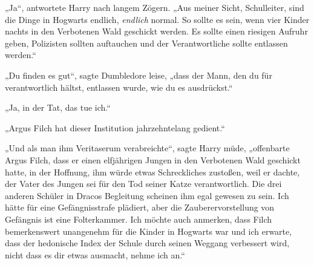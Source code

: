 „Ja“, antwortete Harry nach langem Zögern.
„Aus meiner Sicht, Schulleiter, sind die Dinge in Hogwarts endlich, \emph{endlich} normal. So sollte es sein, wenn vier Kinder nachts in den Verbotenen Wald geschickt werden. Es sollte einen riesigen Aufruhr geben, Polizisten sollten auftauchen und der Verantwortliche sollte entlassen werden.“

„Du finden es gut“, sagte Dumbledore leise, „dass der Mann, den du für verantwortlich hältst, entlassen wurde, wie du es ausdrückst.“

„Ja, in der Tat, das tue ich.“

„Argus Filch hat dieser Institution jahrzehntelang gedient.“

„Und als man ihm Veritaserum verabreichte“, sagte Harry müde, „offenbarte Argus Filch, dass er einen elfjährigen Jungen in den Verbotenen Wald geschickt hatte, in der Hoffnung, ihm würde etwas Schreckliches zustoßen, weil er dachte, der Vater des Jungen sei für den Tod seiner Katze verantwortlich. Die drei anderen Schüler in Dracos Begleitung scheinen ihm egal gewesen zu sein. Ich hätte für eine Gefängnisstrafe plädiert, aber die Zauberervorstellung von Gefängnis ist eine Folterkammer. Ich möchte auch anmerken, dass Filch bemerkenswert unangenehm für die Kinder in Hogwarts war und ich erwarte, dass der hedonische Index der Schule durch seinen Weggang verbessert wird, nicht dass es dir etwas ausmacht, nehme ich an.“


